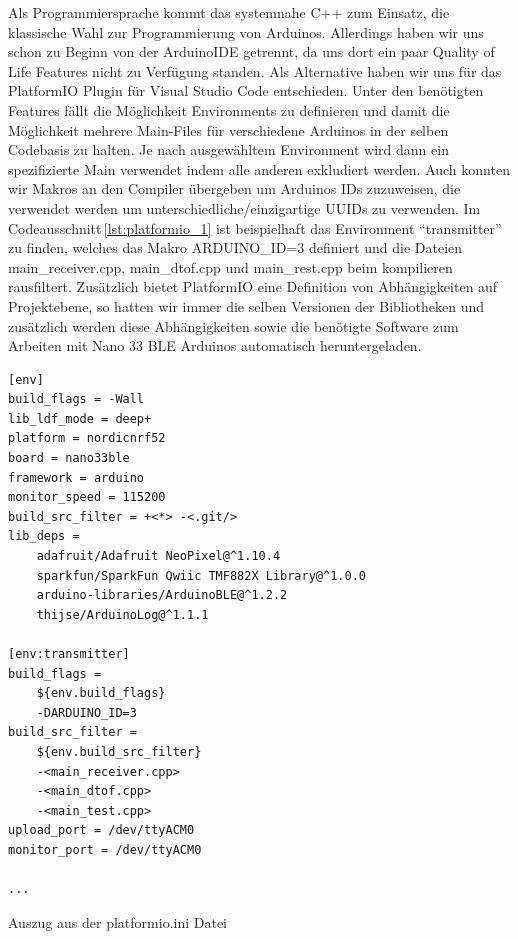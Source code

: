         Als Programmiersprache kommt das systemnahe C++ zum Einsatz, die klassische Wahl zur Programmierung von Arduinos.
        Allerdings haben wir uns schon zu Beginn von der ArduinoIDE getrennt, da uns dort ein paar Quality of Life Features nicht zu Verfügung standen.
        Als Alternative haben wir uns für das PlatformIO Plugin für Visual Studio Code entschieden. Unter den benötigten Features fällt die Möglichkeit Environments zu definieren und damit die Möglichkeit mehrere Main-Files für verschiedene Arduinos in der selben Codebasis zu halten. Je nach ausgewähltem Environment wird dann ein spezifizierte Main verwendet indem alle anderen exkludiert werden. Auch konnten wir Makros an den Compiler übergeben um Arduinos IDs zuzuweisen, die verwendet werden um unterschiedliche/einzigartige UUIDs zu verwenden. Im Codeausschnitt\,\ref{lst:platformio_1} ist beispielhaft das Environment \enquote{transmitter} zu finden, welches das Makro ARDUINO\_ID=3 definiert und die Dateien main\_receiver.cpp, main\_dtof.cpp und main\_rest.cpp beim kompilieren rausfiltert.
        Zusätzlich bietet PlatformIO eine Definition von Abhängigkeiten auf Projektebene, so hatten wir immer die selben Versionen der Bibliotheken und zusätzlich werden diese Abhängigkeiten sowie die benötigte Software zum Arbeiten mit Nano 33 BLE Arduinos automatisch heruntergeladen.

        \begin{listing}
            \begin{verbatim}
[env]
build_flags = -Wall
lib_ldf_mode = deep+
platform = nordicnrf52
board = nano33ble
framework = arduino
monitor_speed = 115200
build_src_filter = +<*> -<.git/>
lib_deps = 
	adafruit/Adafruit NeoPixel@^1.10.4
	sparkfun/SparkFun Qwiic TMF882X Library@^1.0.0
	arduino-libraries/ArduinoBLE@^1.2.2
	thijse/ArduinoLog@^1.1.1

[env:transmitter]
build_flags = 
    ${env.build_flags}
    -DARDUINO_ID=3
build_src_filter =
    ${env.build_src_filter}
    -<main_receiver.cpp>
    -<main_dtof.cpp>
    -<main_test.cpp>
upload_port = /dev/ttyACM0
monitor_port = /dev/ttyACM0

...
            \end{verbatim}
            \caption{Auszug aus der platformio.ini Datei}
            \label{lst:platformio_1}
        \end{listing}

